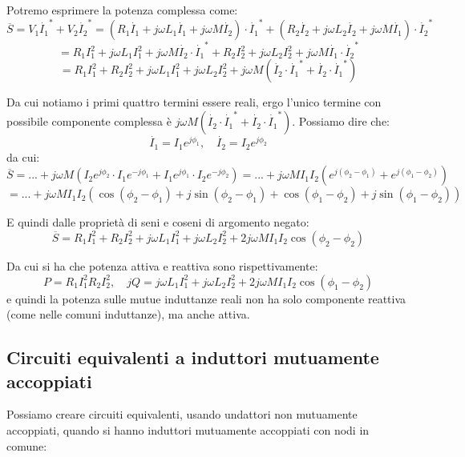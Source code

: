 \documentclass[a4paper,11pt]{article}
\begin{document}
Potremo esprimere la potenza complessa come:
$$
\overline{S} = V_1 \dot{I_1}^* + V_2 \dot{I_2}^* = \left( R_1 \dot{I_1} + j \omega L_1 \dot{I_1} + j \omega M \dot{I_2} \right) \cdot \dot{I_1}^* + \left( R_2 \dot{I_2} + j \omega L_2 \dot{I_2} + j \omega M \dot{I_1} \right) \cdot \dot{I_2}^*
$$
$$
= R_1 I_1^2 + j \omega L_1 I_1^2 + j \omega M \dot{I_2} \cdot \dot{I_1}^* + R_2 I_2^2 + j \omega L_2 I_2^2 + j \omega M \dot{I_1} \cdot \dot{I_2}^*
$$
$$
= R_1 I_1^2 + R_2 I_2^2 + j \omega L_1 I_1^2 + j \omega L_2 I_2^2 + j \omega M ( \dot{I_2} \cdot \dot{I_1}^* + \dot{I_2} \cdot \dot{I_1}^* )
$$

Da cui notiamo i primi quattro termini essere reali, ergo l'unico termine con possibile componente complessa è $j \omega M ( \dot{I_2} \cdot \dot{I_1}^* + \dot{I_2} \cdot \dot{I_1}^* )$.
Possiamo dire che:
$$
\dot{I_1} = I_1 e^{j \phi_1}, \quad \dot{I_2} = I_2 e^{j \phi_2}
$$
da cui:
$$
\overline{S} = ... + j \omega M \left( I_2 e^{j \phi_2} \cdot I_1 e^{-j \phi_1} + I_1 e^{j \phi_1} \cdot I_2 e^{-j \phi_2} \right) = ... + j \omega M I_1 I_2 \left( e^{j(\phi_2 - \phi_1)} + e^{j(\phi_1 - \phi_2)} \right)
$$
$$
= ... + j \omega M I_1 I_2 \left( \cos(\phi_2 - \phi_1) + j \sin (\phi_2 - \phi_1) + \cos(\phi_1 - \phi_2) + j \sin(\phi_1 - \phi_2) \right)
$$

E quindi dalle proprietà di seni e coseni di argomento negato:
$$
\overline{S} = R_1 I_1^2 + R_2 I_2 ^2 + j \omega L_1 I_1^2 + j \omega L_2 I_2^2 + 2 j \omega M I_1 I_2 \cos(\phi_2 - \phi_2)
$$

Da cui si ha che potenza attiva e reattiva sono rispettivamente:
$$
P = R_1 I_1^2 R_2 I_2^2, \quad jQ = j \omega L_1 I_1^2 + j \omega L_2 I_2^2 + 2 j \omega M I_1 I_2 \cos(\phi_1 - \phi_2)
$$
e quindi la potenza sulle mutue induttanze reali non ha solo componente reattiva (come nelle comuni induttanze), ma anche attiva. 

\subsection{Circuiti equivalenti a induttori mutuamente accoppiati}
Possiamo creare circuiti equivalenti, usando undattori non mutuamente accoppiati, quando si hanno induttori mutuamente accoppiati con nodi in comune:
\end{document}
